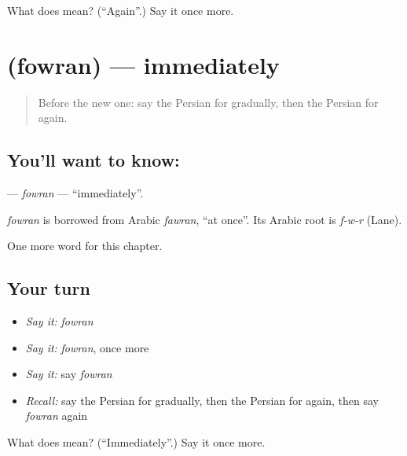 \begin{tcolorbox}[breakable,colback=teal!4,colframe=teal!35!black,title={Before you move on}]
What does  mean? (\textquotedblleft{}Again\textquotedblright{}.) Say it once more.
\end{tcolorbox}
\section[\texorpdfstring{\fa{فورا} (fowran)}{فورا (fowran)}]{ (fowran) — immediately}

\label{lesson:FA-C192-fowran}



\begin{quote}
Before the new one: say the Persian for gradually, then the Persian for again.
\end{quote}

\subsection*{You'll want to know: }
\textbf{} — \emph{fowran} — \textquotedblleft{}immediately\textquotedblright{}.

\begin{cousinweb}
\emph{fowran} is borrowed from Arabic \emph{fawran}, \textquotedblleft{}at once\textquotedblright{}. Its Arabic root is \emph{f-w-r} (Lane).
\end{cousinweb}

\begin{grammarlens}[title={What you've built}]
One more word for this chapter.
\end{grammarlens}

\subsection*{Your turn}
\begin{itemize}
\raggedright
  \item \emph{Say it:} \emph{fowran}
  \item \emph{Say it:} \emph{fowran}, once more
  \item \emph{Say it:} say \emph{fowran}
  \item \emph{Recall:} say the Persian for gradually, then the Persian for again, then say \emph{fowran} again
\end{itemize}

\begin{tcolorbox}[breakable,colback=teal!4,colframe=teal!35!black,title={Before you move on}]
What does  mean? (\textquotedblleft{}Immediately\textquotedblright{}.) Say it once more.
\end{tcolorbox}
